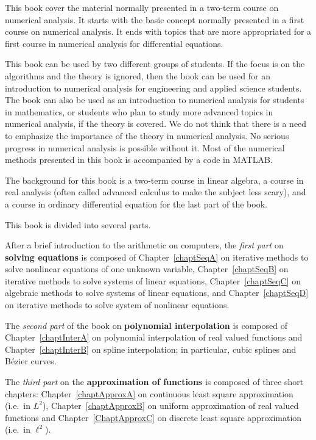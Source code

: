 
This book cover the material normally presented in a two-term course on
numerical analysis.  It starts with the basic concept normally presented
in a first course on numerical analysis.  It ends with topics that are
more appropriated for a first course in numerical analysis for
differential equations.

This book can be used by two different groups of students.  If the
focus is on the algorithms and the theory is ignored, then the book
can be used for an introduction to numerical analysis for engineering
and applied science students.  The book can also be used as an
introduction to numerical analysis for students in mathematics, or
students who plan to study more advanced topics in numerical analysis, if
the theory is covered.  We do not think that there is a need to
emphasize the importance of the theory in numerical analysis.  No
serious progress in numerical analysis is possible without it.
Most of the numerical methods presented in this book is accompanied by
a code in MATLAB.

The background for this book is a two-term course in linear algebra,
a course in real analysis (often called advanced calculus to make
the subject less scary), and a course in ordinary differential
equation for the last part of the book.

This book is divided into several parts.

After a brief introduction to the arithmetic on computers, the
{\em first part} on {\bfseries solving equations} is composed of
Chapter~\ref{chaptSeqA} on iterative methods to solve nonlinear
equations of one unknown variable, Chapter~\ref{chaptSeqB} on
iterative methods to solve systems of linear equations,
Chapter~\ref{chaptSeqC} on algebraic methods to solve systems of
linear equations, and Chapter~\ref{chaptSeqD} on iterative methods to
solve system of nonlinear equations.

The {\em second part} of the book on {\bfseries polynomial interpolation}
is composed of Chapter~\ref{chaptInterA} on polynomial interpolation of
real valued functions and Chapter~\ref{chaptInterB} on spline
interpolation; in particular, cubic splines and Bézier curves.

The {\em third part} on the {\bfseries approximation of functions} is
composed of three short chapters: Chapter~\ref{chaptApproxA} on
continuous least square approximation (i.e.\ in $L^2$), 
Chapter~\ref{chaptApproxB} on uniform approximation of real
valued functions and Chapter~\ref{ChaptApproxC} on discrete least square
approximation (i.e.\ in $\ell^2$).

